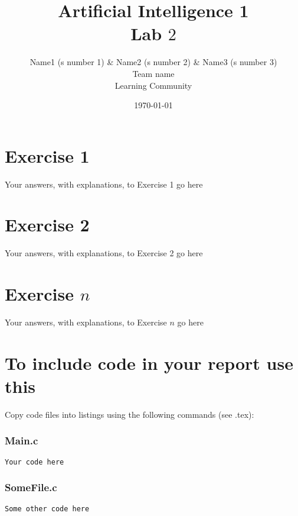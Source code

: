\documentclass{article}
\title{{\bf Artificial Intelligence 1} \\ Lab $2$}%
\author{
Name1 (s number 1) \& Name2 (s number 2) \& Name3 (s number 3) \\ 
Team name \\
Learning Community
} %
\date{\today}%
\begin{document}
\maketitle

\section*{Exercise 1}

Your answers, with explanations, to Exercise 1 go here

\section*{Exercise 2}

Your answers, with explanations, to Exercise 2 go here

\section*{Exercise $n$}

Your answers, with explanations, to Exercise $n$ go here


\section*{To include code in your report use this}

Copy code files into listings using the following commands (see .tex):

\subsubsection*{Main.c}
\begin{lstlisting}
Your code here
\end{lstlisting}

\subsubsection*{SomeFile.c}
\begin{lstlisting}
Some other code here
\end{lstlisting}
\end{document}
